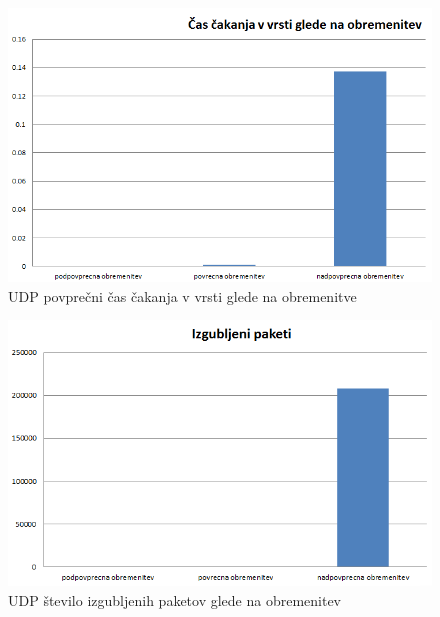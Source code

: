 \documentclass[11pt, a4paper, slovene]{book}
\begin{document}
\begin{figure}[h]
	\centering
	\includegraphics[width=\textwidth]{UDP_cas_cakanja_obremenitev.png}
	\caption{UDP povprečni čas čakanja v vrsti glede na obremenitve}
	\label{4}	
\end{figure}

\begin{figure}[h]
	\centering
	\includegraphics[width=\textwidth]{UDP_izgubljeni_paketi_obremenitev.png}
	\caption{UDP število izgubljenih paketov glede na obremenitev}
	\label{5}	
\end{figure}
\end{document}
